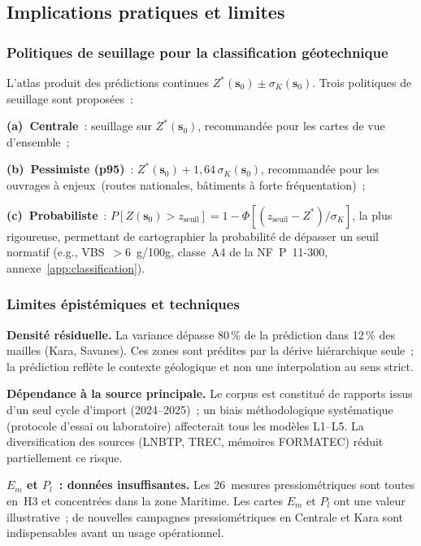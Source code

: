 \documentclass[10pt,a4paper,twocolumn]{article}
\newcommand{\bs}{\mathbf{s}}
\begin{document}
	\subsection{Implications pratiques et limites}
	\label{subsec:limites}
	
	\subsubsection{Politiques de seuillage pour la classification géotechnique}
	
	L'atlas produit des prédictions continues $Z^*(\bs_0)\pm\sigma_K(\bs_0)$.
	Trois politiques de seuillage sont proposées~:
	
	\textbf{(a)~Centrale}~: seuillage sur $Z^*(\bs_0)$,
	recommandée pour les cartes de vue d'ensemble~;
	
	\textbf{(b)~Pessimiste (p95)}~:
	$Z^*(\bs_0)+1{,}64\,\sigma_K(\bs_0)$,
	recommandée pour les ouvrages à enjeux~(routes nationales,
	bâtiments à forte fréquentation)~;
	
	\textbf{(c)~Probabiliste}~:
	$P[Z(\bs_0)>z_{\mathrm{seuil}}]=
	1-\Phi[(z_{\mathrm{seuil}}-Z^*)/\sigma_K]$,
	la plus rigoureuse, permettant de cartographier la probabilité
	de dépasser un seuil normatif (e.g., VBS~$>6$~g/100g,
	classe~A4 de la NF~P~11-300, annexe~\ref{app:classification}).
	
	\subsubsection{Limites épistémiques et techniques}
	
	\textbf{Densité résiduelle.}
	La variance dépasse 80\,\% de la prédiction dans 12\,\% des
	mailles (Kara, Savanes). Ces zones sont prédites par la dérive
	hiérarchique seule~; la prédiction reflète le contexte géologique
	et non une interpolation au sens strict.
	
	\textbf{Dépendance à la source principale.}
	Le corpus est constitué de rapports issus d'un seul cycle
	d'import (2024--2025)~; un biais méthodologique systématique
	(protocole d'essai ou laboratoire) affecterait tous les
	modèles L1--L5. La diversification des sources (LNBTP, TREC,
	mémoires FORMATEC) réduit partiellement ce risque.

	\textbf{$E_m$ et $P_l$~: données insuffisantes.}
	Les 26~mesures pressiométriques sont toutes en~H3 et concentrées
	dans la zone Maritime. Les cartes $E_m$ et $P_l$ ont une valeur
	illustrative~; de nouvelles campagnes pressiométriques en Centrale
	et Kara sont indispensables avant un usage opérationnel.
	
\end{document}
